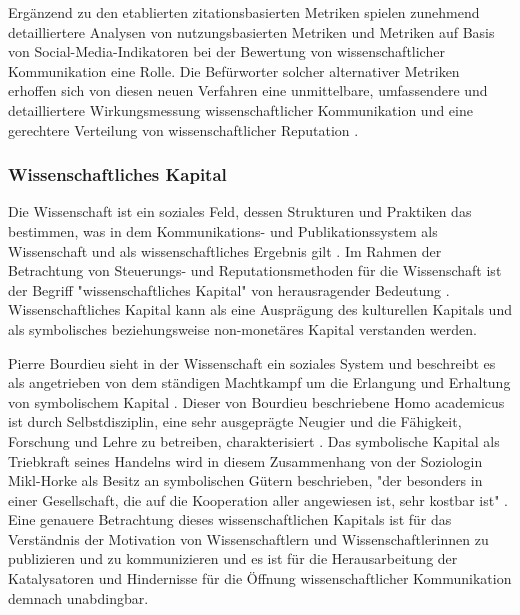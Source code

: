 Ergänzend zu den etablierten zitationsbasierten Metriken spielen zunehmend detailliertere Analysen von nutzungsbasierten Metriken und Metriken auf Basis von Social-Media-Indikatoren \cite{peters_2015_research} bei der Bewertung von wissenschaftlicher Kommunikation eine Rolle. Die Befürworter solcher alternativer Metriken erhoffen sich von diesen neuen Verfahren eine unmittelbare, umfassendere und detailliertere Wirkungsmessung wissenschaftlicher Kommunikation und eine gerechtere Verteilung von wissenschaftlicher Reputation \cite{peters_2015_research} \cite{cite:17} \cite{dora_2013}.

\subsubsection{Wissenschaftliches Kapital}

Die Wissenschaft ist ein soziales Feld, dessen Strukturen und Praktiken das bestimmen, was in dem Kommunikations- und Publikationssystem als Wissenschaft und als wissenschaftliches Ergebnis gilt \cite{mikl_2010_soziologie}. Im Rahmen der Betrachtung von Steuerungs- und Reputationsmethoden für die Wissenschaft ist der Begriff "wissenschaftliches Kapital" von herausragender Bedeutung \cite{Barl_sius_2008}. Wissenschaftliches Kapital kann als eine Ausprägung des kulturellen Kapitals und als symbolisches beziehungsweise non-monetäres Kapital \cite{irmer2011} \cite{hagner_2015_sache_buches} \cite{bourdieu_1988_homo} verstanden werden.

Pierre Bourdieu sieht in der Wissenschaft ein soziales System und beschreibt es als angetrieben von dem ständigen Machtkampf um die Erlangung und Erhaltung von symbolischem Kapital \cite{bourdieu_1988_homo}. Dieser von Bourdieu beschriebene Homo academicus ist durch Selbstdisziplin, eine sehr ausgeprägte Neugier und die Fähigkeit, Forschung und Lehre zu betreiben, charakterisiert \cite{bourdieu_1988_homo}. Das symbolische Kapital als Triebkraft seines Handelns wird in diesem Zusammenhang von der Soziologin Mikl-Horke als Besitz an symbolischen Gütern beschrieben, "der besonders in einer Gesellschaft, die auf die Kooperation aller angewiesen ist, sehr kostbar ist" \cite{mikl_2010_soziologie}. Eine genauere Betrachtung dieses wissenschaftlichen Kapitals ist für das Verständnis der Motivation von Wissenschaftlern und Wissenschaftlerinnen zu publizieren und zu kommunizieren und es ist für die Herausarbeitung der Katalysatoren und Hindernisse für die Öffnung wissenschaftlicher Kommunikation demnach unabdingbar.

